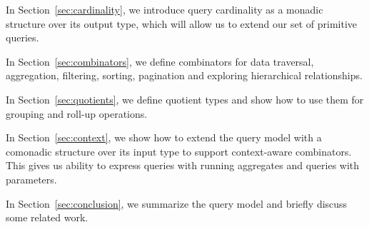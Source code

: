 In Section~\ref{sec:cardinality}, we introduce query cardinality as a mo\-nadic
structure over its output type, which will allow us to extend our set of
primitive queries.

In Section~\ref{sec:combinators}, we define combinators for data traversal,
aggregation, filtering, sorting, pagination and exploring hierarchical
relationships.

In Section~\ref{sec:quotients}, we define quotient types and show how to use
them for grouping and roll-up operations.

In Section~\ref{sec:context}, we show how to extend the query model with a
comonadic structure over its input type to support context-aware combinators.
This gives us ability to express queries with running aggregates and queries
with parameters.

In Section~\ref{sec:conclusion}, we summarize the query model and briefly
discuss some related work.

